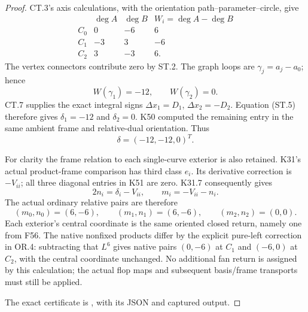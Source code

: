 \begin{proof}
\par\nobreak

CT.3's axis calculations, with the orientation
path--parameter--circle, give
\[
 \begin{array}{c|rr|r}
 &\deg A&\deg B&W_i=\deg A-\deg B\\ \hline
 C_0&0&-6&6\\
 C_1&-3&3&-6\\
 C_2&3&-3&6.
 \end{array}                                             \tag{ST.8}
\]
The vertex connectors contribute zero by ST.2. The graph loops are
\(\gamma_j=a_j-a_0\); hence
\[
                  W(\gamma_1)=-12,\qquad W(\gamma_2)=0.
\]
CT.7 supplies the exact integral signs
\(\Delta x_1=D_1\), \(\Delta x_2=-D_2\). Equation (ST.5)
therefore gives \(\delta_1=-12\) and \(\delta_2=0\).
K50 computed the remaining entry in the same ambient frame and
relative-dual orientation. Thus
\[
                       \delta=(-12,-12,0)^T.           \tag{ST.9}
\]

For clarity the frame relation to each single-curve exterior is also
retained. K31's actual product-frame comparison has third class
\(e_i\). Its derivative correction is \(-V_{ii}\); all three
diagonal entries in K51 are zero. K31.7 consequently gives
\[
 2n_i=\delta_i-V_{ii},\qquad m_i=-V_{ii}-n_i.
\]
The actual ordinary relative pairs are therefore
\[
 (m_0,n_0)=(6,-6),\qquad
 (m_1,n_1)=(6,-6),\qquad
 (m_2,n_2)=(0,0).                                     \tag{ST.10}
\]
Each exterior's central coordinate is the same oriented closed
return, namely one from F56. The native nonfixed products differ by
the explicit pure-left correction in OR.4: subtracting that \(L^6\)
gives native pairs \((0,-6)\) at \(C_1\) and \((-6,0)\) at
\(C_2\), with the central coordinate unchanged. No additional fan
return is assigned by this calculation; the actual flop maps and
subsequent basis/frame transports must still be applied.

The exact certificate is , with its JSON and captured output.
\end{proof}
